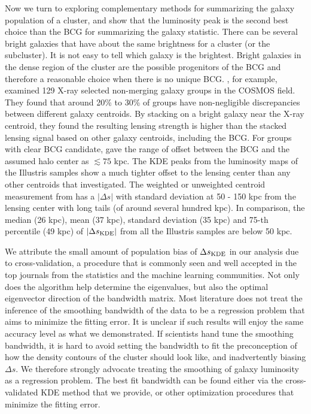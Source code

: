Now we turn to exploring complementary methods for summarizing
the galaxy population of a cluster, and show that  the luminosity peak 
is the second best choice than the BCG for summarizing the galaxy statistic.
There can be several bright galaxies that have about the same brightness 
for a cluster (or the subcluster). It is not easy to tell which galaxy is the
brightest.  
Bright galaxies in the dense region of the cluster are the possible progenitors 
of the BCG and therefore a reasonable choice when there is no unique BCG. 
\cite{George2012a}, for example, examined 129 X-ray selected non-merging galaxy 
groups in the COSMOS field.
They found that around 20\% to 30\% of groups have non-negligible discrepancies
between different galaxy centroids. 
By stacking on a bright galaxy near the X-ray centroid, they found  
the resulting lensing strength is higher than the stacked lensing signal based
on other galaxy centroids, including the BCG. 
For groups with clear BCG candidate, \cite{George2012a} gave the range of
offset between the BCG and the assumed halo center as $\lesssim 75$ kpc. 
The KDE peaks from the luminosity maps of the Illustris samples show a much 
tighter offset to the 
lensing center than any other centroids that \cite{George2012a} investigated. 
The weighted or unweighted centroid measurement from \cite{George2012a} has a 
$|\Delta s|$ with standard deviation at 50 - 150 kpc from the
lensing center with long tails (of around several hundred kpc). 
In comparison, the median (26 kpc), mean (37 kpc), standard deviation (35 kpc) 
and 75-th percentile (49 kpc) of 
$|\Delta s_{\rm KDE}|$ from all the Illustris samples are below 50 kpc. 

We attribute the small amount of population bias of $\Delta s_{\rm KDE}$ in our
analysis due 
to cross-validation, a procedure that is commonly seen and well accepted 
in the top journals 
from the statistics and the machine learning communities. 
Not only does the algorithm help
determine the eigenvalues, but also the optimal eigenvector direction of 
the bandwidth matrix. 
Most literature does not treat the inference of the smoothing bandwidth 
of the data to be a regression problem that aims to minimize the fitting error.  
It is unclear if such results will enjoy the same accuracy level as what
we demonstrated. 
If scientists hand tune the smoothing bandwidth, it is hard to
avoid setting the bandwidth to fit the preconception of how the density
contours of the cluster 
should look like, and inadvertently biasing $\Delta s$. We therefore strongly
advocate treating the smoothing of galaxy luminosity as a regression problem.
The best fit bandwidth can be found either via 
the cross-validated KDE method that we provide, or other optimization  
procedures that minimize the fitting error.

